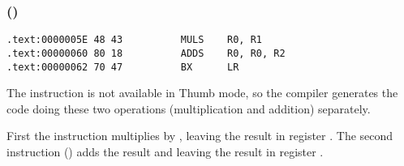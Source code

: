 \subsubsection{\OptimizingKeilVI (\ThumbMode)}

\begin{lstlisting}[label=ARM_leaf_example2,style=customasmARM]
.text:0000005E 48 43          MULS    R0, R1
.text:00000060 80 18          ADDS    R0, R0, R2
.text:00000062 70 47          BX      LR
\end{lstlisting}

The  instruction is not available in Thumb mode, so the compiler generates the code doing these two 
operations (multiplication and addition) separately.

First the  instruction multiplies  by , leaving the result in register .
The second instruction () adds the result and  leaving the result in register .

